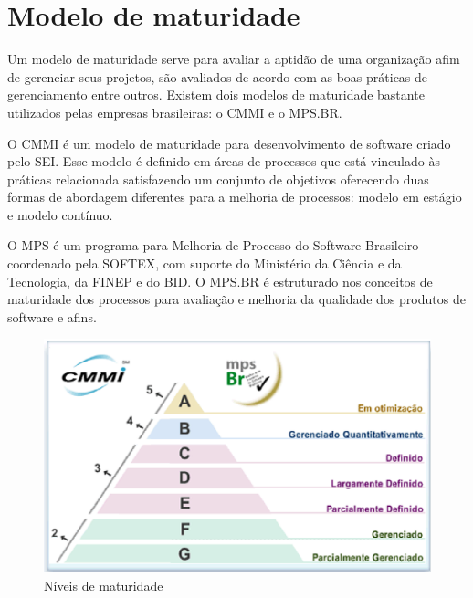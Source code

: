\chapter{Modelo de maturidade}


	Um modelo de maturidade serve para avaliar a aptidão de uma organização afim de gerenciar seus projetos, são avaliados de acordo com as boas práticas de gerenciamento entre outros. Existem dois modelos de maturidade bastante utilizados pelas empresas brasileiras: o CMMI e o MPS.BR.

	O CMMI é um modelo de maturidade para desenvolvimento de software criado pelo SEI. Esse modelo é definido em áreas de processos que está vinculado às práticas relacionada satisfazendo um conjunto de objetivos oferecendo duas formas de abordagem diferentes para a melhoria de processos: modelo em estágio e modelo contínuo.
	
	O MPS é um programa para Melhoria de Processo do Software Brasileiro coordenado pela SOFTEX, com suporte do Ministério da Ciência e da Tecnologia, da FINEP e do BID. O MPS.BR é estruturado nos conceitos de maturidade dos processos para avaliação e melhoria da qualidade dos produtos de software e afins.

	\begin{figure}[!htpb]
			\centering
			\includegraphics[scale=0.5]{figuras/maturidade/cmmi_mps}
			\caption{Níveis de maturidade}
	\end{figure}

	\section{}
